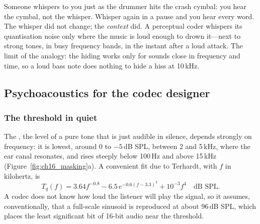 \begin{analogy}
Someone whispers to you just as the drummer hits the crash cymbal: you hear the cymbal, not the
whisper. Whisper again in a pause and you hear every word. The whisper did not change; the
\emph{context} did. A perceptual coder whispers its quantisation noise only where the music is
loud enough to drown it---next to strong tones, in busy frequency bands, in the instant after a
loud attack. The limit of the analogy: the hiding works only for sounds close in frequency and
time, so a loud bass note does nothing to hide a hiss at 10\,kHz.
\end{analogy}

\subsection{Psychoacoustics for the codec designer}

\subsubsection{The threshold in quiet}

The , the level of a pure tone that is just audible in silence,
depends strongly on frequency: it is lowest, around 0 to $-5$\,dB SPL, between 2 and 5\,kHz, where the
ear canal resonates, and rises steeply below 100\,Hz and above 15\,kHz
(Figure~\ref{fig:ch16_masking}a). A convenient fit due to Terhardt, with $f$ in kilohertz, is
\begin{equation}
T_q(f)=3.64f^{-0.8}-6.5\,e^{-0.6(f-3.3)^2}+10^{-3}f^4\quad\text{dB SPL}.
\label{eq:ch16:ath}
\end{equation}
A codec does not know how loud the listener will play the signal, so it assumes, conventionally, that a
full-scale sinusoid is reproduced at about 96\,dB SPL, which places the least significant bit of 16-bit
audio near the threshold.


